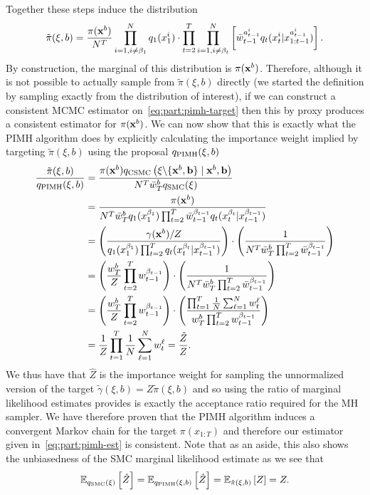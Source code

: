Together these steps induce the distribution
\begin{align}
\label{eq:part:pimh-target}
\tilde{\pi}(\xi,b) = \frac{\pi(\mathbf{x}^{b})}{N^T} \prod_{i=1, i\neq\beta_1}^N q_1(x_{1}^i) \cdot \prod_{t=2}^T \prod_{i=1, i\neq\beta_t}^N \left[ 
\bar w_{t-1}^{a_{t-1}^i}
q_t(x_{t}^i|x_{1:t-1}^{a_{t-1}^i}) \right].
\end{align}
By construction, the marginal of this distribution is $\pi(\mathbf{x}^{b})$.
Therefore, although it is not possible to actually
sample from $\tilde{\pi}(\xi,b)$ directly (we started the definition by sampling exactly
from the distribution of interest), if we can
construct a consistent MCMC estimator on~\eqref{eq:part:pimh-target} then this by proxy
produces a consistent estimator for $\pi(\mathbf{x}^{b})$.
We can now show that this is exactly what the
PIMH algorithm does by explicitly calculating the importance weight implied by
targeting $\tilde{\pi}(\xi,b)$ using the proposal $q_{\text{PIMH}}(\mathbf{\xi},b)$
\begin{align}
\frac{\tilde{\pi}(\xi,b)}{q_{\text{PIMH}}(\mathbf{\xi},b)} &= \frac{\pi(\mathbf{x}^{b}) q_{\text{CSMC}}\left(\mathbf{\xi} \backslash \{\mathbf{x}^b, \mathbf{b}\} \mid \mathbf{x}^b, \mathbf{b} \right)}
{N^T \bar{w}_T^b q_{\text{SMC}}(\mathbf{\xi})} \\
&= \frac{\pi(\mathbf{x}^{b})}{N^T \bar{w}_T^b q_1(x_1^{\beta_1}) \prod_{t=2}^{T} \bar{w}_{t-1}^{\beta_{t-1}} q_t(x_t^{\beta_t} | x_{t-1}^{\beta_{t-1}})} \nonumber \\
&= \left(\frac{\gamma(\mathbf{x}^{b})/Z}{
	q_1(x_1^{\beta_1}) \prod_{t=2}^{T} q_t(x_t^{\beta_t} | x_{t-1}^{\beta_{t-1}})}\right) \cdot
	\left( \frac{1}{N^T \bar{w}_T^b\prod_{t=2}^{T} \bar{w}_{t-1}^{\beta_{t-1}}} \right) \nonumber \\
&= \left(\frac{w_T^b}{Z}
	 \prod_{t=2}^{T} w_{t-1}^{\beta_{t-1}}\right)\cdot\left(
	\frac{1}{N^T \bar{w}_T^b \prod_{t=2}^{T} \bar{w}_{t-1}^{\beta_{t-1}}}\right) \nonumber \\
&= \left(\frac{w_T^b}{Z}
	\prod_{t=2}^{T} w_{t-1}^{\beta_{t-1}}\right)\cdot\left(
	\frac{\prod_{t=1}^T \frac{1}{N} \sum_{\ell=1}^N w_{t}^{\ell}}{w_T^b \prod_{t=2}^{T} w_{t-1}^{\beta_{t-1}}}\right) \nonumber \\
&= \frac{1}{Z} \prod_{t=1}^T \frac{1}{N} \sum_{\ell=1}^N w_{t}^{\ell}
= \frac{\hat{Z}}{Z}. \label{eq:part:pimh-w}
\end{align}
We thus have that $\hat{Z}$ is the importance weight for sampling the unnormalized
version of the target $\tilde{\gamma}(\xi,b) = Z \tilde{\pi}(\xi,b)$ and so using the
ratio of marginal likelihood estimates provides is exactly the acceptance ratio required for
the MH sampler.  We
have therefore proven that the PIMH algorithm induces a convergent Markov chain for
the target $\pi(x_{1:T})$ and therefore our estimator given in~\eqref{eq:part:pimh-est} is
consistent.
Note that as an aside, this also shows the unbiasedness of the SMC marginal likelihood estimate
as we see that
\begin{align}
\mathbb{E}_{q_{\text{SMC}}(\mathbf{\xi})} \left[\hat{Z}\right] = \mathbb{E}_{q_{\text{PIMH}}(\mathbf{\xi},b)} 
\left[\hat{Z}\right]=\mathbb{E}_{\tilde{\pi}(\xi,b)} \left[Z\right]=Z.
\end{align}

